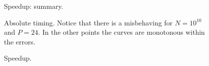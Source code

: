 \documentclass[11pt,a4paper]{article}
\numberwithin{equation}{section}
\begin{document}
\begin{figure}[htbp]
    \centering
    
    \caption{Speedup: summary.}
    \label{fig:weak_sum}
\end{figure}   

\begin{figure}[htbp]
    \centering
    
    \caption{Absolute timing. Notice that there is a misbehaving for $N=10^{10}$ and $P=24$. In the other points the curves are monotonous within the errors.}
    \label{fig:weak_a}
\end{figure}
\begin{figure}[htbp]
    \centering
    
    \caption{Speedup.}
    \label{fig:weak_s}
\end{figure}
 
\end{document}
